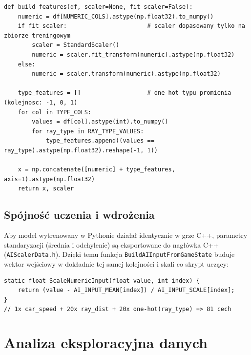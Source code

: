 \documentclass[11pt,a4paper]{article}
\begin{document}
\noindent\begin{minipage}{\linewidth}
\begin{lstlisting}[style=py,caption={Budowa cech wejściowych: standaryzacja liczb i one-hot typów (fragment \texttt{train\_driver\_model.py}).}]
def build_features(df, scaler=None, fit_scaler=False):
    numeric = df[NUMERIC_COLS].astype(np.float32).to_numpy()
    if fit_scaler:                       # scaler dopasowany tylko na zbiorze treningowym
        scaler = StandardScaler()
        numeric = scaler.fit_transform(numeric).astype(np.float32)
    else:
        numeric = scaler.transform(numeric).astype(np.float32)

    type_features = []                   # one-hot typu promienia (kolejnosc: -1, 0, 1)
    for col in TYPE_COLS:
        values = df[col].astype(int).to_numpy()
        for ray_type in RAY_TYPE_VALUES:
            type_features.append((values == ray_type).astype(np.float32).reshape(-1, 1))

    x = np.concatenate([numeric] + type_features, axis=1).astype(np.float32)
    return x, scaler
\end{lstlisting}
\end{minipage}

\subsection{Spójność uczenia i wdrożenia}

Aby model wytrenowany w Pythonie działał identycznie w grze C++, parametry
standaryzacji (średnia i odchylenie) są eksportowane do nagłówka C++
(\texttt{AIScalerData.h}). Dzięki temu funkcja \texttt{BuildAIInputFromGameState}
buduje wektor wejściowy w dokładnie tej samej kolejności i skali co skrypt uczący:

\noindent\begin{minipage}{\linewidth}
\begin{lstlisting}[style=cpp,caption={Standaryzacja cech po stronie gry (fragment \texttt{AIInputBuilder.cpp}).}]
static float ScaleNumericInput(float value, int index) {
    return (value - AI_INPUT_MEAN[index]) / AI_INPUT_SCALE[index];
}
// 1x car_speed + 20x ray_dist + 20x one-hot(ray_type) => 81 cech
\end{lstlisting}
\end{minipage}

\section{Analiza eksploracyjna danych}
\label{sec:eda}
\end{document}
